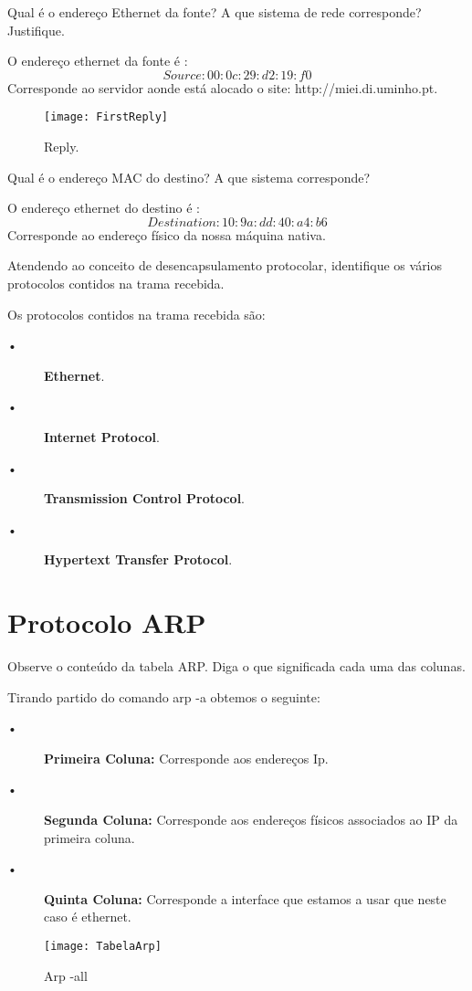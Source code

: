 \documentclass{exam}
\begin{document}
\begin{questions}
\question Qual é o endereço Ethernet da fonte? A que sistema de rede corresponde? Justifique.
\begin{solution}
O endereço ethernet da fonte é :
 \begin{equation}
Source:00:0c:29:d2:19:f0
\end{equation}
Corresponde ao servidor aonde está alocado o site: http://miei.di.uminho.pt.
\begin{figure}[H]
\centering\texttt{[image: FirstReply]} 
\caption{\label{fig:controller}Reply.}
\end{figure} 
\end{solution}
\question Qual é o endereço MAC do destino? A que sistema corresponde?
\begin{solution}
O endereço ethernet do destino é :
 \begin{equation}
Destination: 10:9a:dd:40:a4:b6 
\end{equation}
Corresponde ao endereço físico da nossa máquina nativa.
\end{solution}

\question Atendendo ao conceito de desencapsulamento protocolar, identifique os vários protocolos contidos na trama recebida.
\begin{solution}
Os protocolos contidos na trama recebida são:
\begin{description}
	\item[•] \textbf{Ethernet}.
	\item[•] \textbf{Internet Protocol}. 
	\item[•] \textbf{Transmission Control Protocol}.
	\item[•] \textbf{Hypertext Transfer Protocol}.
\end{description}	
\end{solution}

\section{Protocolo ARP}



\question  Observe o conteúdo da tabela ARP. Diga o que significada cada uma das colunas.
\begin{solution}
Tirando partido do comando arp -a obtemos o seguinte:
\begin{description}
	\item[•] \textbf{Primeira Coluna:} Corresponde aos endereços Ip.
	\item[•] \textbf{Segunda Coluna:} Corresponde aos endereços físicos associados ao IP da primeira coluna. 
	\item[•] \textbf{Quinta Coluna:} Corresponde a interface que estamos a usar que neste caso é ethernet.
\end{description}
\begin{figure}[H]
\centering\texttt{[image: TabelaArp]} 
\caption{\label{fig:controller}Arp -all}
\end{figure} 
\end{solution}


\end{questions}
\end{document}

